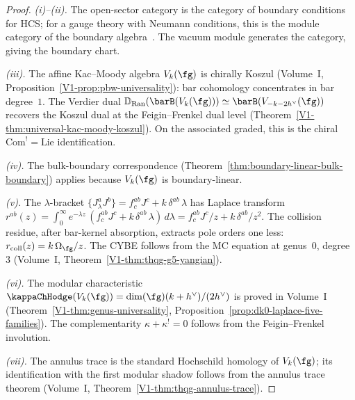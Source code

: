 \begin{proof}
\emph{(i)--(ii).}
The open-sector category is the category of boundary
conditions for HCS; for a gauge theory with Neumann
conditions, this is the module category of the boundary
algebra~\cite{costello-gaiotto}. The vacuum module generates
the category, giving the boundary chart.

\emph{(iii).}
The affine Kac--Moody algebra $V_k(\fg)$ is chirally Koszul
(Volume~I, Proposition~\ref*{V1-prop:pbw-universality}): bar cohomology
concentrates in bar degree~$1$. The Verdier dual
$\mathbb{D}_{\mathrm{Ran}}(\barB(V_k(\fg))) \simeq
\barB(V_{-k-2h^\vee}(\fg))$ recovers the Koszul dual at the
Feigin--Frenkel dual level
(Theorem~\ref*{V1-thm:universal-kac-moody-koszul}). On the
associated graded, this is the chiral
$\mathrm{Com}^! = \mathrm{Lie}$ identification.

\emph{(iv).}
The bulk-boundary correspondence
(Theorem~\ref{thm:boundary-linear-bulk-boundary})
applies because $V_k(\fg)$ is boundary-linear.

\emph{(v).}
The $\lambda$-bracket
$\{J^a_\lambda J^b\} = f^{ab}_c J^c + k\, \delta^{ab}\, \lambda$
has Laplace transform
$r^{ab}(z) = \int_0^\infty e^{-\lambda z}\,
(f^{ab}_c J^c + k\, \delta^{ab}\, \lambda)\, d\lambda
= f^{ab}_c J^c / z + k\, \delta^{ab} / z^2$.
The collision residue, after bar-kernel absorption,
extracts pole orders one less: $r_{\mathrm{coll}}(z)
= k\,\Omega_\fg / z$. The CYBE follows from the MC equation at
genus~$0$, degree~$3$
(Volume~I, Theorem~\ref*{V1-thm:thqg-g5-yangian}).

\emph{(vi).}
The modular characteristic
$\kappaChHodge(V_k(\fg)) = \dim(\fg)(k + h^\vee)/(2h^\vee)$
is proved in Volume~I
(Theorem~\ref*{V1-thm:genus-universality},
Proposition~\ref{prop:dk0-laplace-five-families}).
The complementarity $\kappa + \kappa^! = 0$ follows from
the Feigin--Frenkel involution.

\emph{(vii).}
The annulus trace is the standard Hochschild homology of
$V_k(\fg)$; its identification with the first modular shadow
follows from the annulus trace theorem
(Volume~I, Theorem~\ref*{V1-thm:thqg-annulus-trace}).
\end{proof}

